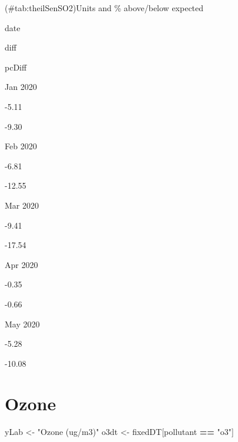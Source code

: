 \documentclass[]{article}
\newenvironment{Shaded}{\begin{snugshade}}{\end{snugshade}}
\newcommand{\KeywordTok}[1]{\textcolor[rgb]{0.13,0.29,0.53}{\textbf{#1}}}
\newcommand{\DataTypeTok}[1]{\textcolor[rgb]{0.13,0.29,0.53}{#1}}
\newcommand{\DecValTok}[1]{\textcolor[rgb]{0.00,0.00,0.81}{#1}}
\newcommand{\StringTok}[1]{\textcolor[rgb]{0.31,0.60,0.02}{#1}}
\newcommand{\OperatorTok}[1]{\textcolor[rgb]{0.81,0.36,0.00}{\textbf{#1}}}
\newcommand{\NormalTok}[1]{#1}
\begin{document}
\begin{Shaded}
\end{Shaded}

(\#tab:theilSenSO2)Units and \% above/below expected

date

diff

pcDiff

Jan 2020

-5.11

-9.30

Feb 2020

-6.81

-12.55

Mar 2020

-9.41

-17.54

Apr 2020

-0.35

-0.66

May 2020

-5.28

-10.08

\section{Ozone}\label{ozone}

\begin{Shaded}
\begin{Highlighting}[]
\NormalTok{yLab <-}\StringTok{ "Ozone (ug/m3)"}
\NormalTok{o3dt <-}\StringTok{ }\NormalTok{fixedDT[pollutant }\OperatorTok{==}\StringTok{ "o3"}\NormalTok{]}
\end{Highlighting}
\end{Shaded}
\end{document}
